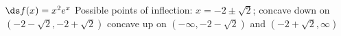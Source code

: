 {$\ds f(x) = x^2e^x$
}
{Possible points of inflection: $x=-2\pm\sqrt{2}$;
concave down on $(-2-\sqrt{2},-2+\sqrt{2})$
concave up on $(-\infty,-2-\sqrt{2})$ and $(-2+\sqrt{2},\infty)$
}
